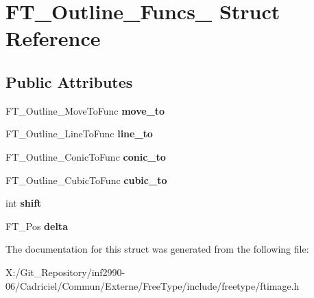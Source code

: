 \hypertarget{struct_f_t___outline___funcs__}{\section{F\-T\-\_\-\-Outline\-\_\-\-Funcs\-\_\- Struct Reference}
\label{struct_f_t___outline___funcs__}
}
\subsection*{Public Attributes}
\begin{DoxyCompactItemize}
\item 
\hypertarget{struct_f_t___outline___funcs___abd53463a59a1ae2c6998e619c2ab6a65}{F\-T\-\_\-\-Outline\-\_\-\-Move\-To\-Func {\bfseries move\-\_\-to}}\label{struct_f_t___outline___funcs___abd53463a59a1ae2c6998e619c2ab6a65}

\item 
\hypertarget{struct_f_t___outline___funcs___a876fc8ca7541786cd3c4ec3806f88360}{F\-T\-\_\-\-Outline\-\_\-\-Line\-To\-Func {\bfseries line\-\_\-to}}\label{struct_f_t___outline___funcs___a876fc8ca7541786cd3c4ec3806f88360}

\item 
\hypertarget{struct_f_t___outline___funcs___a09681f5a64189066d3fba3cf398a135b}{F\-T\-\_\-\-Outline\-\_\-\-Conic\-To\-Func {\bfseries conic\-\_\-to}}\label{struct_f_t___outline___funcs___a09681f5a64189066d3fba3cf398a135b}

\item 
\hypertarget{struct_f_t___outline___funcs___aa3e0c1bacb181a5f43c104ab7f72cfda}{F\-T\-\_\-\-Outline\-\_\-\-Cubic\-To\-Func {\bfseries cubic\-\_\-to}}\label{struct_f_t___outline___funcs___aa3e0c1bacb181a5f43c104ab7f72cfda}

\item 
\hypertarget{struct_f_t___outline___funcs___a540c246669b21b86cb405b3d9019cfda}{int {\bfseries shift}}\label{struct_f_t___outline___funcs___a540c246669b21b86cb405b3d9019cfda}

\item 
\hypertarget{struct_f_t___outline___funcs___a3c3121398b3ff564b4f3fd5b2a318e5e}{F\-T\-\_\-\-Pos {\bfseries delta}}\label{struct_f_t___outline___funcs___a3c3121398b3ff564b4f3fd5b2a318e5e}

\end{DoxyCompactItemize}


The documentation for this struct was generated from the following file\-:\begin{DoxyCompactItemize}
\item 
X\-:/\-Git\-\_\-\-Repository/inf2990-\/06/\-Cadriciel/\-Commun/\-Externe/\-Free\-Type/include/freetype/ftimage.\-h\end{DoxyCompactItemize}
